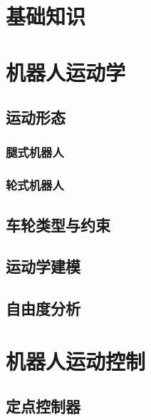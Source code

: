 \documentclass[
12pt, %
a4paper, 
oneside, %
headinclude,footinclude, %
]{scrartcl}
\title{\normalfont\spacedallcaps{智能工程}}
\date{}
\begin{document}
\maketitle
\newpage
\tableofcontents 
\newpage
\listoffigures
\listoftables
\listoftips
\newpage
\section{基础知识}
\section{机器人运动学}
\subsection{运动形态}
\subsubsection{腿式机器人}
\subsubsection{轮式机器人}
\subsection{车轮类型与约束}
\subsection{运动学建模}
\subsection{自由度分析}
\section{机器人运动控制}
\subsection{定点控制器}
\end{document}
